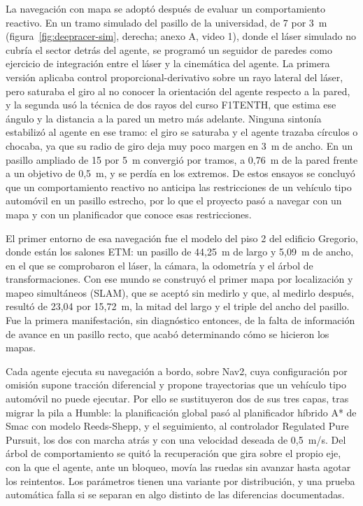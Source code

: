 La navegación con mapa se adoptó después de evaluar un comportamiento reactivo. En un tramo simulado del pasillo de la universidad, de 7 por 3~m (figura~\ref{fig:deepracer-sim}, derecha; anexo A, video 1), donde el láser simulado no cubría el sector detrás del agente, se programó un seguidor de paredes como ejercicio de integración entre el láser y la cinemática del agente. La primera versión aplicaba control proporcional-derivativo sobre un rayo lateral del láser, pero saturaba el giro al no conocer la orientación del agente respecto a la pared, y la segunda usó la técnica de dos rayos del curso F1TENTH, que estima ese ángulo y la distancia a la pared un metro más adelante. Ninguna sintonía estabilizó al agente en ese tramo: el giro se saturaba y el agente trazaba círculos o chocaba, ya que su radio de giro deja muy poco margen en 3~m de ancho. En un pasillo ampliado de 15 por 5~m convergió por tramos, a 0,76~m de la pared frente a un objetivo de 0,5~m, y se perdía en los extremos. De estos ensayos se concluyó que un comportamiento reactivo no anticipa las restricciones de un vehículo tipo automóvil en un pasillo estrecho, por lo que el proyecto pasó a navegar con un mapa y con un planificador que conoce esas restricciones.

El primer entorno de esa navegación fue el modelo del piso 2 del edificio Gregorio, donde están los salones ETM: un pasillo de 44,25~m de largo y 5,09~m de ancho, en el que se comprobaron el láser, la cámara, la odometría y el árbol de transformaciones. Con ese mundo se construyó el primer mapa por localización y mapeo simultáneos (SLAM), que se aceptó sin medirlo y que, al medirlo después, resultó de 23,04 por 15,72~m, la mitad del largo y el triple del ancho del pasillo. Fue la primera manifestación, sin diagnóstico entonces, de la falta de información de avance en un pasillo recto, que acabó determinando cómo se hicieron los mapas.

Cada agente ejecuta su navegación a bordo, sobre Nav2, cuya configuración por omisión supone tracción diferencial y propone trayectorias que un vehículo tipo automóvil no puede ejecutar. Por ello se sustituyeron dos de sus tres capas, tras migrar la pila a Humble: la planificación global pasó al planificador híbrido A* de Smac con modelo Reeds-Shepp, y el seguimiento, al controlador Regulated Pure Pursuit, los dos con marcha atrás y con una velocidad deseada de 0,5~m/s. Del árbol de comportamiento se quitó la recuperación que gira sobre el propio eje, con la que el agente, ante un bloqueo, movía las ruedas sin avanzar hasta agotar los reintentos. Los parámetros tienen una variante por distribución, y una prueba automática falla si se separan en algo distinto de las diferencias documentadas.

